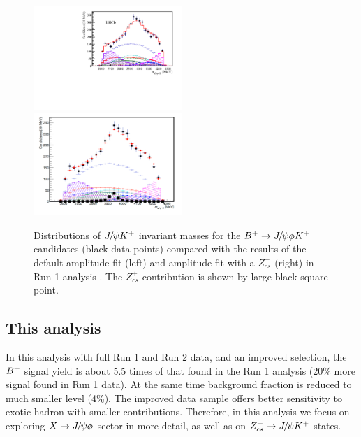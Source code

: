 \begin{figure}[hbtp]  
  \begin{center}
    \includegraphics[width=0.5\textwidth]{Figures/01_Introduction/Physics/from_Zcs/newbase_JpsiKh}%
    \includegraphics[width=0.5\textwidth]{Figures/01_Introduction/Physics/from_Zcs/Z_JpsiKh}  
  \end{center}
\caption{
    Distributions of  ${{J\mskip -3mu/\mskip -2mu\psi}} K^+$
    invariant masses for the ${{{B}^+}}\rightarrow{\ensuremath{{J\mskip -3mu/\mskip -2mu\psi}}} \phi K^+$ candidates (black data points) 
    compared with the results of the default amplitude fit (left) and amplitude fit with a $Z_{cs}^+$ (right) in Run 1 analysis \supercite{ThomasBritton:2016}. 
	The $Z_{cs}^+$ contribution is shown by large black square point.}
  \label{fig:jpsikrun1}
\end{figure} 

\subsection{This analysis}
In this analysis with full Run 1 and Run 2 data, 
and an improved selection,  
the ${{{B}^+}}$ signal yield is about 5.5 times of that found in the Run 1 analysis (20\% more signal found in Run 1 data). 
At the same time background fraction is reduced to much smaller level (4\%). 
The improved data sample offers better sensitivity to exotic hadron with smaller contributions. 
Therefore, 
in this analysis we focus on exploring $X\rightarrow{\ensuremath{{J\mskip -3mu/\mskip -2mu\psi}}} \phi$ sector in more detail, 
as well as on $Z_{cs}^+\rightarrow {\ensuremath{{J\mskip -3mu/\mskip -2mu\psi}}} K^+$ states. 







